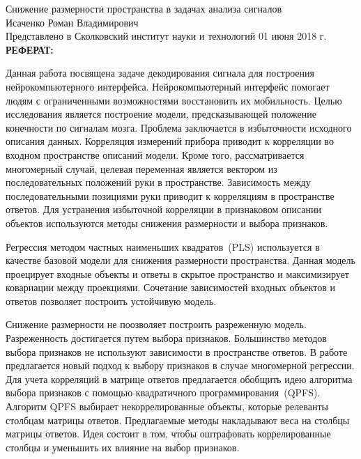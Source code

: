 \documentclass[12pt,oneside]{article}
\theoremstyle{definition}
\begin{document}
\begin{center}
	Снижение размерности пространства в задачах анализа сигналов\\ 
	Исаченко Роман Владимирович \\[5mm]
	Представлено в Сколковский институт науки и технологий 01 июня 2018 г. \\[5mm]
	\textbf{РЕФЕРАТ:} 
\end{center}

Данная работа посвящена задаче декодирования сигнала для построения нейрокомпьютерного интерфейса.
Нейрокомпьютерный интерфейс помогает людям с ограниченными возможностями восстановить их мобильность.
Целью исследования является построение модели, предсказывающей положение конечности по сигналам мозга. 
Проблема заключается в избыточности исходного описания данных. 
Корреляция измерений прибора приводит к корреляции во входном пространстве описаний модели. 
Кроме того, рассматривается многомерный случай, целевая переменная является вектором из последовательных положений руки в пространстве. 
Зависимость между последовательными позициями руки приводит к корреляциям в пространстве ответов.
Для устранения избыточной корреляции в признаковом описании объектов используются методы снижения размерности и выбора признаков.

Регрессия методом частных наименьших квадратов~(PLS) используется в качестве базовой модели для снижения размерности пространства.
Данная модель проецирует входные объекты и ответы в скрытое пространство и максимизирует ковариации между проекциями.
Сочетание зависимостей входных объектов и ответов позволяет построить устойчивую модель.

Снижение размерности не поозволяет построить разреженную модель. Разреженность достигается путем выбора признаков.
Большинство методов выбора признаков не используют зависимости в пространстве ответов.
В работе предлагается новый подход к выбору признаков в случае многомерной регрессии.
Для учета корреляций в матрице ответов предлагается обобщить идею алгоритма выбора признаков с помощью квадратичного программирования~(QPFS). 
Алгоритм QPFS выбирает некоррелированные объекты, которые релеванты столбцам матрицы ответов. 
Предлагаемые методы накладывают веса на столбцы матрицы ответов. 
Идея состоит в том, чтобы оштрафовать коррелированные столбцы и уменьшить их влияние на выбор признаков. 
\end{document}
